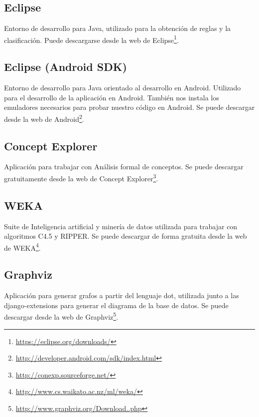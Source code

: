 \subsection{Eclipse}
Entorno de desarrollo para Java, utilizado para la obtención de reglas y la clasificación. Puede descargarse desde la web de Eclipse\footnote{\url{https://eclipse.org/downloads/}}.

\subsection{Eclipse (Android SDK)}
Entorno de desarrollo para Java orientado al desarrollo en Android. Utilizado para el desarrollo de la aplicación en Android. También nos instala los emuladores necesarios para probar nuestro código en Android. Se puede descargar desde la web de Android\footnote{\url{http://developer.android.com/sdk/index.html}}.

\subsection{Concept Explorer}
Aplicación para trabajar con Análisis formal de conceptos. Se puede descargar gratuitamente desde la web de Concept Explorer\footnote{\url{http://conexp.sourceforge.net/}}.
\subsection{WEKA}
Suite de Inteligencia artificial y minería de datos utilizada para trabajar con algoritmos C4.5 y RIPPER. Se puede descargar de forma gratuita desde la web de WEKA\footnote{\url{http://www.cs.waikato.ac.nz/ml/weka/}}.

\subsection{Graphviz}
Aplicación para generar grafos a partir del lenguaje dot, utilizada junto a las django-extensions para generar el diagrama de la base de datos. Se puede descargar desde la web de Graphviz\footnote{\url{http://www.graphviz.org/Download..php}}.